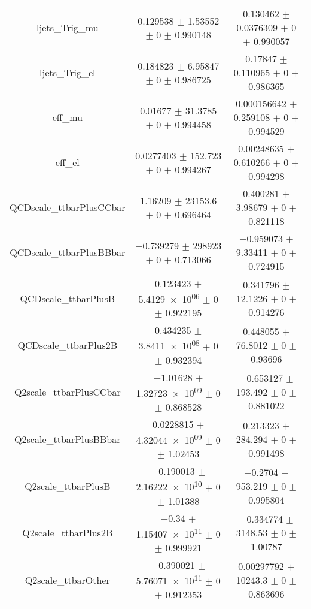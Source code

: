 \begin{table}
\begin{tabular}{ccc}
ljets\_Trig\_mu & \num{0.129538} $\pm$ \num{1.53552} $\pm$ \num{0} $\pm$ \num{0.990148} & \num{0.130462} $\pm$ \num{0.0376309} $\pm$ \num{0} $\pm$ \num{0.990057}\\
ljets\_Trig\_el & \num{0.184823} $\pm$ \num{6.95847} $\pm$ \num{0} $\pm$ \num{0.986725} & \num{0.17847} $\pm$ \num{0.110965} $\pm$ \num{0} $\pm$ \num{0.986365}\\
eff\_mu & \num{0.01677} $\pm$ \num{31.3785} $\pm$ \num{0} $\pm$ \num{0.994458} & \num{0.000156642} $\pm$ \num{0.259108} $\pm$ \num{0} $\pm$ \num{0.994529}\\
eff\_el & \num{0.0277403} $\pm$ \num{152.723} $\pm$ \num{0} $\pm$ \num{0.994267} & \num{0.00248635} $\pm$ \num{0.610266} $\pm$ \num{0} $\pm$ \num{0.994298}\\
QCDscale\_ttbarPlusCCbar & \num{1.16209} $\pm$ \num{23153.6} $\pm$ \num{0} $\pm$ \num{0.696464} & \num{0.400281} $\pm$ \num{3.98679} $\pm$ \num{0} $\pm$ \num{0.821118}\\
QCDscale\_ttbarPlusBBbar & \num{-0.739279} $\pm$ \num{298923} $\pm$ \num{0} $\pm$ \num{0.713066} & \num{-0.959073} $\pm$ \num{9.33411} $\pm$ \num{0} $\pm$ \num{0.724915}\\
QCDscale\_ttbarPlusB & \num{0.123423} $\pm$ \num{5.4129e+06} $\pm$ \num{0} $\pm$ \num{0.922195} & \num{0.341796} $\pm$ \num{12.1226} $\pm$ \num{0} $\pm$ \num{0.914276}\\
QCDscale\_ttbarPlus2B & \num{0.434235} $\pm$ \num{3.8411e+08} $\pm$ \num{0} $\pm$ \num{0.932394} & \num{0.448055} $\pm$ \num{76.8012} $\pm$ \num{0} $\pm$ \num{0.93696}\\
Q2scale\_ttbarPlusCCbar & \num{-1.01628} $\pm$ \num{1.32723e+09} $\pm$ \num{0} $\pm$ \num{0.868528} & \num{-0.653127} $\pm$ \num{193.492} $\pm$ \num{0} $\pm$ \num{0.881022}\\
Q2scale\_ttbarPlusBBbar & \num{0.0228815} $\pm$ \num{4.32044e+09} $\pm$ \num{0} $\pm$ \num{1.02453} & \num{0.213323} $\pm$ \num{284.294} $\pm$ \num{0} $\pm$ \num{0.991498}\\
Q2scale\_ttbarPlusB & \num{-0.190013} $\pm$ \num{2.16222e+10} $\pm$ \num{0} $\pm$ \num{1.01388} & \num{-0.2704} $\pm$ \num{953.219} $\pm$ \num{0} $\pm$ \num{0.995804}\\
Q2scale\_ttbarPlus2B & \num{-0.34} $\pm$ \num{1.15407e+11} $\pm$ \num{0} $\pm$ \num{0.999921} & \num{-0.334774} $\pm$ \num{3148.53} $\pm$ \num{0} $\pm$ \num{1.00787}\\
Q2scale\_ttbarOther & \num{-0.390021} $\pm$ \num{5.76071e+11} $\pm$ \num{0} $\pm$ \num{0.912353} & \num{0.00297792} $\pm$ \num{10243.3} $\pm$ \num{0} $\pm$ \num{0.863696}\\

\end{tabular}
\end{table}
